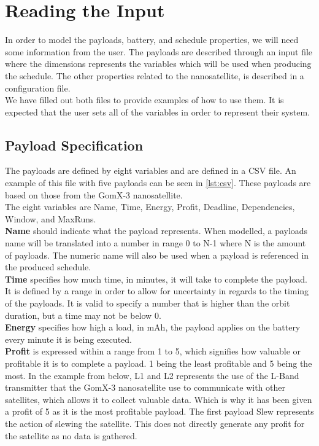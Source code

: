 \section{Reading the Input} \label{sec:read_input}
In order to model the payloads, battery, and schedule properties, we will need some information from the user.
The payloads are described through an input file where the dimensions represents the variables which will be used when producing the schedule.
The other properties related to the nanosatellite, is described in a configuration file.\\
We have filled out both files to provide examples of how to use them. It is expected that the user sets all of the variables in order to represent their system.

\subsection{Payload Specification} \label{subsec:csv}
The payloads are defined by eight variables and are defined in a CSV file. An example of this file with five payloads can be seen in \cref{lst:csv}. 
These payloads are based on those from the GomX-3 nanosatellite\cite{gomx3}.\\
The eight variables are Name, Time, Energy, Profit, Deadline, Dependencies, Window, and MaxRuns.\\
\textbf{Name} should indicate what the payload represents. When modelled, a payloads name will be translated into a number in range 0 to N-1 where N is the amount of payloads. The numeric name will also be used when a payload is referenced in the produced schedule.\\
\textbf{Time} specifies how much time, in minutes, it will take to complete the payload. It is defined by a range in order to allow for uncertainty in regards to the timing of the payloads. It is valid to specify a number that is higher than the orbit duration, but a time may not be below 0.\\
\textbf{Energy} specifies how high a load, in mAh, the payload applies on the battery every minute it is being executed.\\
\textbf{Profit} is expressed within a range from 1 to 5, which signifies how valuable or profitable it is to complete a payload. 1 being the least profitable and 5 being the most. In the example from below, L1 and L2 represents the use of the L-Band transmitter that the GomX-3 nanosatellite use to communicate with other satellites, which allows it to collect valuable data. Which is why it has been given a profit of 5 as it is the most profitable payload. The first payload Slew represents the action of slewing the satellite. This does not directly generate any profit for the satellite as no data is gathered.\\
